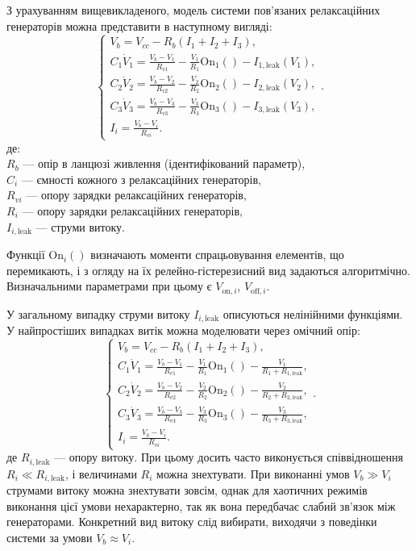 З урахуванням вищевикладеного, модель системи пов'язаних
релаксаційних генераторів можна представити в наступному
вигляді:
%
\begin{equation}
  \begin{cases}
    V_b = V_{cc} - R_b ( I_1 + I_2 + I_3 ), \\
      C_1 \dot{V}_1 = \frac{V_b-V_1}{R_{v1}} - \frac{V_1}{R_1} \mathrm{On}_1() - I_{1,\mathrm{leak}}(V_1), \\
      C_2 \dot{V}_2 = \frac{V_b-V_2}{R_{v2}} - \frac{V_2}{R_2} \mathrm{On}_2() - I_{2,\mathrm{leak}}(V_2), \\
      C_3 \dot{V}_3 = \frac{V_b-V_3}{R_{v3}} - \frac{V_3}{R_3} \mathrm{On}_3() - I_{3,\mathrm{leak}}(V_3), \\
      I_i = \frac{V_b-V_i}{R_{vi}}.
  \end{cases}.
    \label{atu:eq:relax3}
\end{equation}
%
де: \\
$ R_b $ --- опір в ланцюзі живлення (ідентифікований параметр), \\
$ C_i $ --- ємності кожного з релаксаційних генераторів, \\
$ R_{vi} $ --- опору зарядки релаксаційних генераторів, \\
$ R_{ i} $ --- опору зарядки релаксаційних генераторів, \\
$ I_{i, \mathrm{leak}} $ --- струми витоку.


Функції
$ \mathrm{On}_i() $ визначають моменти спрацьовування  елементів, що перемикають,
і з огляду на їх релейно-гістерезисний вид
задаються алгоритмічно. Визначальними параметрами при цьому є
$ V_{\mathrm{on}, i} $,
$ V_{\mathrm{off}, i} $.

У загальному випадку струми витоку
$ I_{i, \mathrm{leak}} $ описуються нелінійними функціями. У найпростіших
випадках витік можна моделювати через омічний опір:
%
\begin{equation}
  \begin{cases}
    V_b = V_{cc} - R_b ( I_1 + I_2 + I_3 ), \\
      C_1 \dot{V}_1 = \frac{V_b-V_1}{R_{v1}} - \frac{V_1}{R_1} \mathrm{On}_1() - \frac{V_1}{R_1+R_{1,\mathrm{leak}}}, \\
      C_2 \dot{V}_2 = \frac{V_b-V_2}{R_{v2}} - \frac{V_2}{R_2} \mathrm{On}_2() - \frac{V_2}{R_2+R_{2,\mathrm{leak}}}, \\
      C_3 \dot{V}_3 = \frac{V_b-V_3}{R_{v3}} - \frac{V_3}{R_3} \mathrm{On}_3() - \frac{V_3}{R_3+R_{3,\mathrm{leak}}}, \\
      I_i = \frac{V_b-V_i}{R_{vi}}.
  \end{cases}.
    \label{atu:eq:relax3_linleak}
\end{equation}
%
де
$ R_{i, \mathrm{leak}} $ --- опору витоку. При цьому досить часто виконується
співвідношення
$ R_{i} \ll R_{i, \mathrm{leak}} $, і величинами
$ R_{i} $ можна знехтувати. При виконанні умов
$ V_b \gg V_i $ струмами витоку можна знехтувати зовсім, однак для
хаотичних режимів виконання цієї умови нехарактерно, так як
вона передбачає слабий зв'язок між генераторами. Конкретний
вид витоку слід вибирати, виходячи з поведінки системи за умови
$ V_b \approx V_i $.

